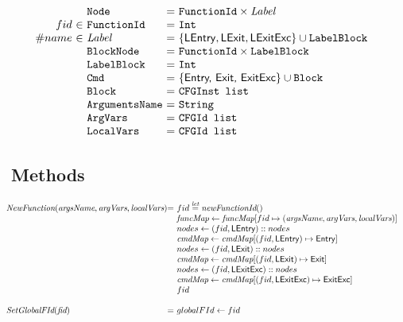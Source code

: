 \[\begin{array}{r@{~}l@{~}l@{}l@{~}l}
&&\Node & = & \FunctionId \times \Label\\
fid&\in&\FunctionId &=& \TT{Int}\\
\#name&\in&\Label &=& \{\LEntry, \LExit, \LExitExc\} \cup \TT{LabelBlock}\\
&&\TT{BlockNode} &=& \FunctionId \times \TT{LabelBlock}\\
&&\TT{LabelBlock} &=& \TT{Int}\\
&&\TT{Cmd} &=& \{\SF{Entry, Exit, ExitExc}\} \cup \TT{Block}\\
&&\TT{Block} &=& \TT{CFGInst list}\\
&&\TT{ArgumentsName}\ & = & \TT{String}\\
&&\ArgVars &=& \TT{CFGId list}\\
&&\LocalVars &=& \TT{CFGId list}\\
\end{array}
\]

\subsection{\CFG\ Methods}
\[
\begin{array}{l@{}l@{~}l}
\emph{NewFunction}(\emph{argsName}, \emph{argVars}, \emph{localVars})
	& = & fid \letval \emph{newFunctionId}()\\
	& & \emph{funcMap} \leftarrow \emph{funcMap}[fid \mapsto (\emph{argsName}, \emph{argVars},\emph{localVars})]\\
	& & nodes \leftarrow (fid,\LEntry)::nodes\\
	& & \emph{cmdMap} \leftarrow \emph{cmdMap}[(fid,\LEntry) \mapsto \SF{Entry}]\\
	& & nodes \leftarrow (fid,\LExit)::nodes\\
	& & \emph{cmdMap} \leftarrow \emph{cmdMap}[(fid,\LExit) \mapsto \SF{Exit}]\\
	& & nodes \leftarrow (fid,\LExitExc)::nodes\\
	& & \emph{cmdMap} \leftarrow \emph{cmdMap}[(fid,\LExitExc) \mapsto \SF{ExitExc}]\\
	& & fid\\
	& & \\

\emph{SetGlobalFId}(\emph{fid})
   & = & globalFId \leftarrow fid \\

\end{array}
\]


